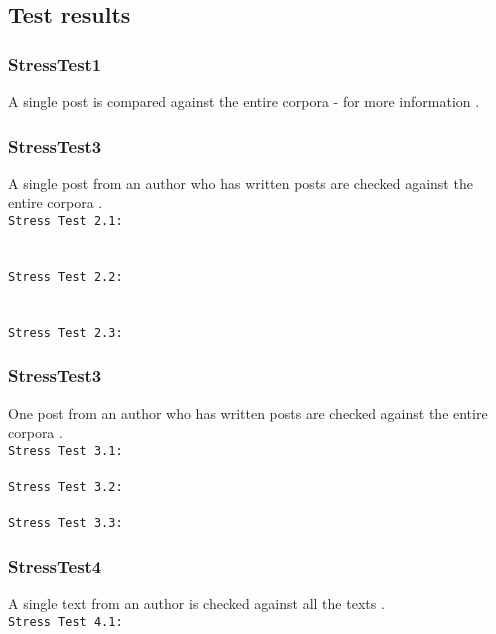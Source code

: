 \begin{description}
\subsection{Test results}

\subsubsection{StressTest1}
A single post is compared against the entire corpora - for more information .\\


\subsubsection{StressTest3}
A single post from an author who has written  posts are checked against the entire corpora .\\
\texttt{Stress Test 2.1:}\\

\\ \\

\texttt{Stress Test 2.2:}\\
\\ \\

\texttt{Stress Test 2.3:}\\


\subsubsection{StressTest3}
One post from an author who has written  posts are checked against the entire corpora .\\
\texttt{Stress Test 3.1:}\\
\\

\texttt{Stress Test 3.2:}\\
\\

\texttt{Stress Test 3.3:}\\


\subsubsection{StressTest4}
A single text from an author is checked against all the texts  .\\
\texttt{Stress Test 4.1:}\\
\\


\end{description}
